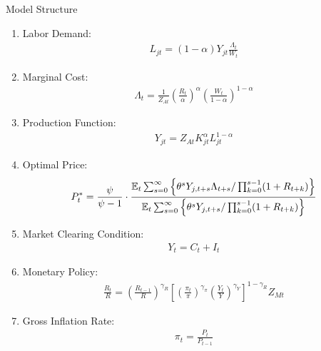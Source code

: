 \documentclass[
presentation.tex
]{subfiles}
\begin{document}
\begin{frame}[allowframebreaks]{Model Structure}
{\begin{enumerate}
	\item Labor Demand:
	\begin{align}
		L_{jt} = (1-\alpha) Y_{jt} \frac{\Lambda_t}{W_t}
	\end{align}
	
	
	\item Marginal Cost:
	\begin{align}
		\Lambda_t = \frac{1}{Z_{At}} \left( \frac{R_t}{\alpha} \right)^{\alpha} \left( \frac{W_t}{1-\alpha} \right)^{1-\alpha}
	\end{align}
	
	\item Production Function:
	\begin{align}
		Y_{jt} = Z_{At} K_{jt}^\alpha L_{jt}^{1-\alpha}
	\end{align}
	
	\item Optimal Price:
	\begin{align}
		P_t^\ast = \frac{\psi}{\psi-1} \cdot \frac{ \E \sum_{s=0}^{\infty} \left\{ \theta^s Y_{j,t+s} \Lambda_{t+s} / \prod_{k=0}^{s-1}(1+R_{t+k}) \right\} } {\E \sum_{s=0}^{\infty} \left\{ \theta^s Y_{j,t+s} / \prod_{k=0}^{s-1}(1 + R_{t+k}) \right\}} %
	\end{align}
	
	\item Market Clearing Condition:
	\begin{align}
		Y_t = C_t + I_t
	\end{align}
	
	\item Monetary Policy:
	\begin{align}
		\frac{R_t}{R} = \left( 
		\frac{R_{t-1}}{R} \right)^{\gamma_R} \left[ \left(
		\frac{\pi_t}{\pi} \right)^{\gamma_\pi} \left( 
		\frac{Y_t}{Y} \right)^{\gamma_Y} \right]^{1-\gamma_R} Z_{Mt}
	\end{align}
	
	\item Gross Inflation Rate:
	\begin{align}
		\pi_t = \frac{P_t}{P_{t-1}}
	\end{align}
	

\end{enumerate}}
\end{frame}
\end{document}
